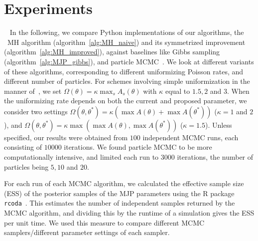 
\section{Experiments}~
In the following, we compare Python implementations of our algorithms,
the \naive\ MH algorithm (algorithm~\ref{alg:MH_naive}) and its symmetrized
improvement (algorithm~\ref{alg:MH_improved}), against 
baselines like Gibbs sampling (algorithm~\ref{alg:MJP_gibbs}),
and particle MCMC~\cite{Andrieu10}. We look at different variants
of these algorithms, corresponding to different uniformizing Poisson 
rates, and different number of particles.
For schemes involving simple uniformization in the manner of~\cite{RaoTeh13}, we 
set $\Omega(\theta) = \kappa \max_s A_s(\theta) $ with $\kappa$  equal to 
$1.5, 2$ and $3$. When the uniformizing rate depends on both the current and 
proposed parameter, we consider two settings
 $\Omega(\theta, \theta^*) = \kappa (\max A(\theta) + \max A(\theta^*))$ 
 ($\kappa = 1$ and $2$), and 
$\Omega(\theta, \theta^*) = \kappa \max(\max A(\theta), \max A(\theta^*))$
($\kappa=1.5$). 
Unless specified, our results were
obtained from $100$ independent MCMC runs, each consisting of $10000$ iterations.
We found particle MCMC to be more computationally intensive, and limited each 
run to $3000$ iterations, the number of particles being $5, 10$ and $20$. 


For each run of each MCMC algorithm, we calculated the effective sample size 
(ESS) of the posterior samples of the MJP parameters using the R package 
\texttt{rcoda}~\cite{Rcoda2006}. This estimates the number of independent 
samples returned by the MCMC algorithm, and dividing this by the runtime of a 
simulation gives the ESS per unit time. We used this measure to compare 
different MCMC samplers/different parameter settings of each sampler.

